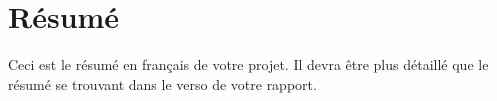 \chapter*{Résumé}

Ceci est le résumé en français de votre projet. Il devra être plus détaillé que le résumé se trouvant dans le verso de votre rapport.